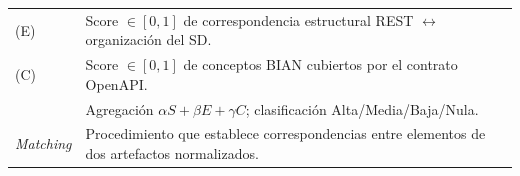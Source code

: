 \begin{table}[H]
\begin{tabular}{@{}p{}p{}@{}}
    \StructuralScore{} (E) &
    Score $\in [0,1]$ de correspondencia estructural REST $\leftrightarrow$ organización del SD. \\
    \CoverageScore{} (C) &
    Score $\in [0,1]$ de conceptos BIAN cubiertos por el contrato OpenAPI. \\
    \AlignmentScore{} &
    Agregación $\alpha S + \beta E + \gamma C$; clasificación Alta/Media/Baja/Nula. \\
    \textit{Matching} &
    Procedimiento que establece correspondencias entre elementos de dos artefactos normalizados. \\
    \bottomrule
  \end{tabular}
\end{table}

